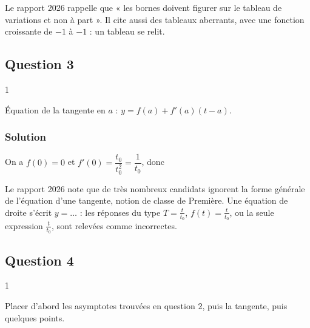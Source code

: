 \documentclass[11pt,a4paper]{article}
\newcommand{\equationajustee}[1]{%
  \sbox{\boiteequation}{$\displaystyle #1$}%
  \ifdim\wd\boiteequation>\linewidth
    \[\resizebox{\linewidth}{!}{\usebox{\boiteequation}}\]%
  \else
    \[#1\]%
  \fi}
\begin{document}
\begin{jury}

Le rapport 2026 rappelle que « les bornes doivent figurer sur le tableau de variations et non à part ». Il cite aussi des tableaux aberrants, avec une fonction croissante de \(-1\) à \(-1\) : un tableau se relit.

\end{jury}

\hypertarget{question-3}{%
\subsection{Question 3}\label{question-3}}

\begin{indication}{1}

Équation de la tangente en \(a\) : \(y=f(a)+f'(a)(t-a)\).

\end{indication}

\hypertarget{solution-2}{%
\subsubsection{Solution}\label{solution-2}}

On a \(f(0)=0\) et \(f'(0)=\dfrac{t_0}{t_0^2}=\dfrac1{t_0}\), donc

\equationajustee{\boxed{T:\ y=\frac{t}{t_0}}}

\begin{jury}

Le rapport 2026 note que de très nombreux candidats ignorent la forme générale de l'équation d'une tangente, notion de classe de Première. Une équation de droite s'écrit \(y=\dots\) : les réponses du type \(T=\frac{t}{t_0}\), \(f(t)=\frac{t}{t_0}\), ou la seule expression \(\frac{t}{t_0}\), sont relevées comme incorrectes.

\end{jury}

\hypertarget{question-4}{%
\subsection{Question 4}\label{question-4}}

\begin{indication}{1}

Placer d'abord les asymptotes trouvées en question 2, puis la tangente, puis quelques points.

\end{indication}
\end{document}
